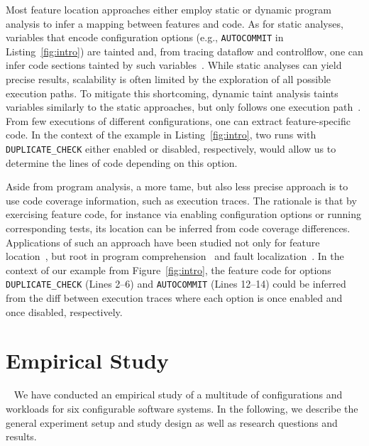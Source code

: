 Most feature location approaches either employ static or dynamic program analysis to infer a mapping between features and code. As for static analyses, variables that encode configuration options (e.g., \texttt{AUTOCOMMIT} in Listing~\ref{fig:intro}) are tainted and, from tracing dataflow and controlflow, one can infer code sections tainted by such variables~\cite{velez_2020_configcrusher_jase,lillack_2018_lotrack_tse,luo_2019_cova}.
While static analyses can yield precise results, scalability is often limited by the exploration of all possible execution paths. To mitigate this shortcoming, dynamic taint analysis taints variables similarly to the static approaches, but only follows one execution path~\cite{bell_phosphor_2014,velez_comprex_2021,splat_kim_2013}. From few executions of different configurations, one can extract feature-specific code. In the context of the example in Listing~\ref{fig:intro}, two runs with \texttt{DUPLICATE\_CHECK} either enabled or disabled, respectively, would allow us to determine the lines of code depending on this option.


Aside from program analysis, a more tame, but also less precise approach is to use code coverage information, such as execution traces.
The rationale is that by exercising feature code, for instance via enabling configuration options or running corresponding tests, its location can be inferred from code coverage differences. Applications of such an approach have been studied not only for feature location~\cite{wong_integrated_2005,sulir_annotation_2015,michelon_spectrum_2021,perez_framing_2016}, but root in program comprehension~\cite{wilde_early_1996,wilde_reconnaissance_1995,sherwood_reducing_nodate,perez_diagnosis_2014,castro_pangolin_2019} and fault localization~\cite{agrawal_fault_1995,wong_faultloc_2016}. In the context of our example from Figure~\ref{fig:intro}, the feature code for options \texttt{DUPLICATE\_CHECK} (\colorbox{duplicatecheck}{Lines 2--6}) and \texttt{AUTOCOMMIT} (\colorbox{autocommit}{Lines 12–14}) could be inferred from the diff between execution traces where each option is once enabled and once disabled, respectively.


\section{Empirical Study}~\label{sec:study}
We have conducted an empirical study of a multitude of configurations and workloads for six configurable software systems. In the following, we describe the general experiment setup and study design as well as research questions and results.

